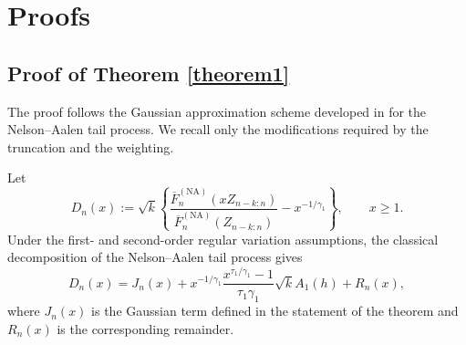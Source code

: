 \documentclass[reqno,openbib,runningheads,a4paper,12pt]{amsart}%
\begin{document}
\section{\textbf{Proofs}\label{sec5}}

\subsection{Proof of Theorem \ref{theorem1}}

\noindent The proof follows the Gaussian approximation scheme developed in
\cite{MNS2025} for the Nelson--Aalen tail process. We recall only the
modifications required by the truncation and the weighting.\smallskip

\noindent Let
\[
D_{n}(x):=\sqrt{k}\left\{  \frac{\overline{F}_{n}^{(\mathrm{NA})}(xZ_{n-k:n}%
)}{\overline{F}_{n}^{(\mathrm{NA})}(Z_{n-k:n})}-x^{-1/\gamma_{1}}\right\}
,\qquad x\geq1.
\]
Under the first- and second-order regular variation assumptions, the classical
decomposition of the Nelson--Aalen tail process gives
\[
D_{n}(x)=J_{n}(x)+x^{-1/\gamma_{1}}\frac{x^{\tau_{1}/\gamma_{1}}-1}{\tau
_{1}\gamma_{1}}\sqrt{k}A_{1}(h)+R_{n}(x),
\]
where $J_{n}(x)$ is the Gaussian term defined in the statement of the theorem
and $R_{n}(x)$ is the corresponding remainder.\smallskip
\end{document}
